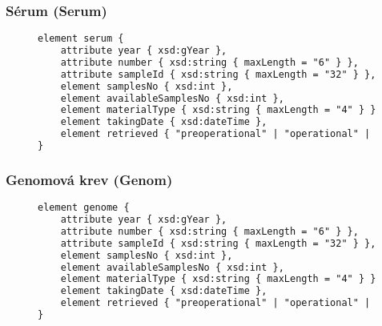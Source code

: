 \subsubsection{Sérum (Serum)}
\begin{figure}[hbtp]
\begin{center}
\begin{lstlisting}[language=XML, caption={Element popisující sérum v~exportním schéma.}]
element serum {
	attribute year { xsd:gYear },
	attribute number { xsd:string { maxLength = "6" } },
	attribute sampleId { xsd:string { maxLength = "32" } },
	element samplesNo { xsd:int },
	element availableSamplesNo { xsd:int },
	element materialType { xsd:string { maxLength = "4" } }
	element takingDate { xsd:dateTime },
	element retrieved { "preoperational" | "operational" | "post" | "unknown" }
}
\end{lstlisting}
\end{center}
\label{fig:export:data:serum}
\end{figure}
\subsubsection{Genomová krev (Genom)}
\begin{figure}[hbtp]
\begin{center}
\begin{lstlisting}[language=XML, caption={Element popisující sérum v~exportním schéma.}]
element genome {
	attribute year { xsd:gYear },
	attribute number { xsd:string { maxLength = "6" } },
	attribute sampleId { xsd:string { maxLength = "32" } },
	element samplesNo { xsd:int },
	element availableSamplesNo { xsd:int },
	element materialType { xsd:string { maxLength = "4" } }
	element takingDate { xsd:dateTime },
	element retrieved { "preoperational" | "operational" | "post" | "unknown" }
}
\end{lstlisting}
\end{center}
\label{fig:export:data:genome}
\end{figure}
